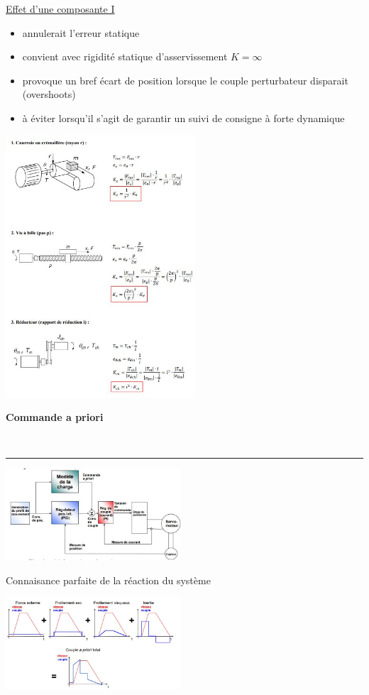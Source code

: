 \documentclass[	DIV=calc,%
							paper=a4,%
							fontsize=10pt,%
							twocolumn]{scrartcl} %
\newcounter{mycounter}
\newcommand{\formdesc}[1]{\large\textbf{#1} \addtocounter{mycounter}{1} \hfill \themycounter \\ \vspace{-3mm} \hrule \vspace{2mm}}
\begin{document}
\underline{Effet d’une composante I}

\begin{itemize}
    \item annulerait l’erreur statique
    \item convient avec rigidité statique d'asservissement $ K = \infty $
    \item provoque un bref écart de position lorsque le couple perturbateur disparait (overshoots)
    \item à éviter lorsqu'il s'agit de garantir un suivi de consigne à forte dynamique
\end{itemize}

\includegraphics[width=0.53\textwidth]{img/flemem.JPG}

\formdesc{Commande a priori}

\includegraphics[width=0.49\textwidth]{img/com_apriorie.JPG}

Connaisance parfaite de la réaction du système 

\includegraphics[width=0.49\textwidth]{img/com_apriorie_2.JPG}
\end{document}
